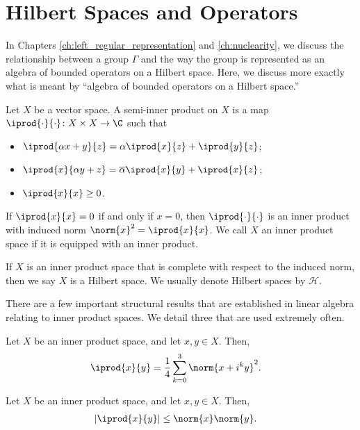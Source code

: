 \section{Hilbert Spaces and Operators}%
In Chapters \ref{ch:left_regular_representation} and \ref{ch:nuclearity}, we discuss the relationship between a group $\Gamma$ and the way the group is represented as an algebra of bounded operators on a Hilbert space. Here, we discuss more exactly what is meant by ``algebra of bounded operators on a Hilbert space.''
\begin{definition}
  Let $X$ be a vector space. A semi-inner product on $X$ is a map $ \iprod{\cdot}{\cdot}\colon X\times X \rightarrow \C $ such that
  \begin{itemize}
    \item $ \iprod{\alpha x + y}{z} = \alpha \iprod{x}{z} + \iprod{y}{z}$;
    \item $ \iprod{x}{\alpha y + z} = \overline{\alpha}\iprod{x}{y} + \iprod{x}{z}$;
    \item $ \iprod{x}{x}\geq 0 $.
  \end{itemize}
  If $ \iprod{x}{x} = 0 $ if and only if $ x = 0 $, then $ \iprod{\cdot}{\cdot} $ is an inner product with induced norm $\norm{x}^2 = \iprod{x}{x}$. We call $X$ an inner product space if it is equipped with an inner product.\newline

  If $X$ is an inner product space that is complete with respect to the induced norm, then we say $X$ is a Hilbert space. We usually denote Hilbert spaces by $ \mathcal{H} $.
\end{definition}
There are a few important structural results that are established in linear algebra relating to inner product spaces. We detail three that are used extremely often.
\begin{theorem}
  Let $X$ be an inner product space, and let $x,y\in X$. Then,
  \begin{align*}
    \iprod{x}{y} &= \frac{1}{4}\sum_{k=0}^{3} \norm{x + i^ky}^2.
  \end{align*}
\end{theorem}
\begin{theorem}
  Let $X$ be an inner product space, and let $x,y\in X$. Then,
  \begin{align*}
    \left\vert \iprod{x}{y} \right\vert &\leq \norm{x}\norm{y}.
  \end{align*}
\end{theorem}
